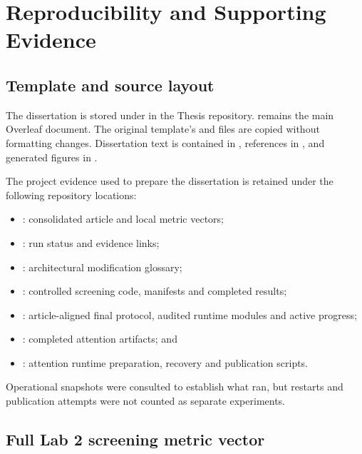 \chapter{Reproducibility and Supporting Evidence}
\label{app:reproducibility}

\section{Template and source layout}

The dissertation is stored under  in the Thesis repository.  remains the main Overleaf document. The original template's  and  files are copied without formatting changes. Dissertation text is contained in , references in , and generated figures in .

The project evidence used to prepare the dissertation is retained under the following repository locations:

\begin{itemize}
    \item {}: consolidated article and local metric vectors;
    \item {}: run status and evidence links;
    \item {}: architectural modification glossary;
    \item {}: controlled screening code, manifests and completed results;
    \item {}: article-aligned final protocol, audited runtime modules and active progress;
    \item {}: completed attention artifacts; and
    \item {}: attention runtime preparation, recovery and publication scripts.
\end{itemize}

Operational snapshots were consulted to establish what ran, but restarts and publication attempts were not counted as separate experiments.

\section{Full Lab 2 screening metric vector}

